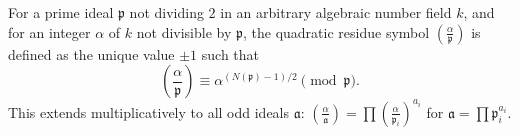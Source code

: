 For a prime ideal $\mathfrak{p}$ not dividing $2$ in an arbitrary algebraic number field $k$, and for an integer $\alpha$ of $k$ not divisible by $\mathfrak{p}$, the quadratic residue symbol $\left(\frac{\alpha}{\mathfrak{p}}\right)$ is defined as the unique value $\pm 1$ such that
$$\left(\frac{\alpha}{\mathfrak{p}}\right) \equiv \alpha^{(N(\mathfrak{p})-1)/2} \pmod{\mathfrak{p}}.$$
This extends multiplicatively to all odd ideals $\mathfrak{a}$: $\left(\frac{\alpha}{\mathfrak{a}}\right) = \prod \left(\frac{\alpha}{\mathfrak{p}_i}\right)^{a_i}$ for $\mathfrak{a} = \prod \mathfrak{p}_i^{a_i}$.
